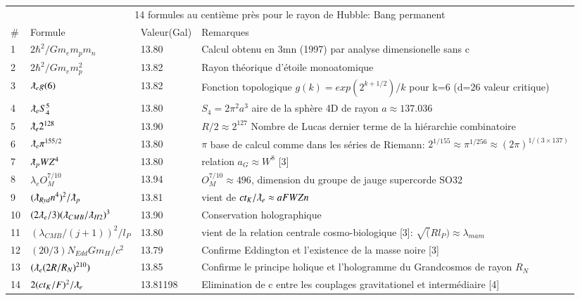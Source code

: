 \documentclass[a4paper,9pt]{article}
\begin{document}
\begin{table*}
  \hskip-2.0cm\begin{tabular}{llll}
    \toprule
    \multicolumn{4}{c}{14 formules au centi\`{e}me pr\`{e}s pour le rayon de Hubble: Bang permanent}                   \\
    \cmidrule(r){1-4}
   \#     & Formule     & Valeur(Gal) & Remarques \\
    \midrule
    1 & $2\hbar^2/Gm_em_pm_n$ & 13.80  & Calcul obtenu en 3mn (1997) par analyse dimensionelle sans c \\
    2 & $2\hbar^2/Gm_em_p^2$ & 13.82  & Rayon th\'{e}orique d'\'{e}toile monoatomique \\
    3 & $\lambdabar_e g(6)$ & 13.82  & Fonction topologique $g(k)=exp(2^{k+1/2})/k$ pour k=6 (d=26 valeur critique)\\
    4 & $\lambdabar_e S_4^5$ & 13.80 & $S_4=2\pi^2a^3$ aire de la sph\`{e}re 4D de rayon $a \approx 137.036$ \\  
    5 & $\lambdabar_e 2^{128}$ & 13.90  & $R/2 \approx 2^{127}$ Nombre de Lucas dernier terme de la hi\'{e}rarchie combinatoire \\ 
    6 & $\lambdabar_e \pi^{155/2}$ & 13.80  & $\pi$ base de calcul comme dans les s\'{e}ries de Riemann: $2^{1/155} \approx \pi^{1/256} \approx (2\pi)^{1/(3\times 137)}$ \\
    7 & $\lambdabar_p WZ^{4}$ & 13.80  & relation $a_G \approx W^8$ [3] \\
    8 & $\lambda_e O_M^{7/10}$ & 13.94 & $O_M^{7/10} \approx 496$, dimension du groupe de jauge supercorde SO32 \\
    9 & $(\lambdabar_{Ryd} n^{4})^2/\lambdabar_p$ & 13.81 & vient de $ct_K/\lambdabar_e \approx aFWZn$ \\ 
    10 & $(2\lambdabar_{e}/3)(\lambdabar_{CMB}/\lambdabar_{H2})^3$ & 13.90  & Conservation holographique \\
    11 & $(\lambda_{CMB}/(j+1))^2/l_P$ & 13.80  & vient de la relation centrale cosmo-biologique [3]: $\sqrt(Rl_P) \approx \lambda_{mam}$ \\
    12 & $(20/3)N_{Edd}Gm_H/c^2$ & 13.79  & Confirme Eddington et l'existence de la masse noire [3] \\
    13 & $(\lambdabar_{e} (2R/R_N)^{210})$ & 13.85  & Confirme le principe holique et l'hologramme du Grandcosmos de rayon $R_N$  \\
    14 & $2(ct_K/F)^2/\lambdabar_{e}$ & 13.81198  & Elimination de c entre les couplages gravitationel et interm\'{e}diaire [4] \\
    \bottomrule
  \end{tabular}
  \label{tab:table}
\end{table*}
\end{document}
